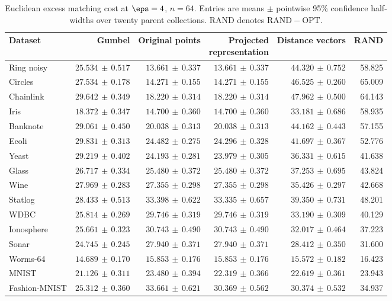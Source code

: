 \begin{table}[p]
\centering\scriptsize
\setlength{\tabcolsep}{3pt}
\caption{Euclidean excess matching cost at $\eps=4$, $n=64$. Entries are means $\pm$ pointwise 95\% confidence half-widths over twenty parent collections. RAND denotes $\mathrm{RAND}-\mathrm{OPT}$.}
\label{tab:exp-bench-p1-eps4}
\begin{tabular}{lrrrrr}
\toprule
Dataset & Gumbel & Original points & \shortstack{Projected\\representation} & Distance vectors & RAND\\
\midrule
Ring noisy & $25.534\,\pm\,0.517$ & $13.661\,\pm\,0.337$ & $13.661\,\pm\,0.337$ & $44.320\,\pm\,0.752$ & 58.825\\
Circles & $27.534\,\pm\,0.178$ & $14.271\,\pm\,0.155$ & $14.271\,\pm\,0.155$ & $46.525\,\pm\,0.260$ & 65.009\\
Chainlink & $29.642\,\pm\,0.349$ & $18.220\,\pm\,0.314$ & $18.220\,\pm\,0.314$ & $47.962\,\pm\,0.500$ & 64.143\\
Iris & $18.372\,\pm\,0.347$ & $14.700\,\pm\,0.360$ & $14.700\,\pm\,0.360$ & $33.181\,\pm\,0.686$ & 58.935\\
Banknote & $29.061\,\pm\,0.450$ & $20.038\,\pm\,0.313$ & $20.038\,\pm\,0.313$ & $44.162\,\pm\,0.443$ & 57.155\\
Ecoli & $29.831\,\pm\,0.313$ & $24.482\,\pm\,0.275$ & $24.296\,\pm\,0.328$ & $41.697\,\pm\,0.367$ & 52.776\\
Yeast & $29.219\,\pm\,0.402$ & $24.193\,\pm\,0.281$ & $23.979\,\pm\,0.305$ & $36.331\,\pm\,0.615$ & 41.638\\
Glass & $26.717\,\pm\,0.334$ & $25.480\,\pm\,0.372$ & $25.480\,\pm\,0.372$ & $37.253\,\pm\,0.695$ & 43.824\\
Wine & $27.969\,\pm\,0.283$ & $27.355\,\pm\,0.298$ & $27.355\,\pm\,0.298$ & $35.426\,\pm\,0.297$ & 42.668\\
Statlog & $28.433\,\pm\,0.513$ & $33.398\,\pm\,0.622$ & $33.335\,\pm\,0.657$ & $39.350\,\pm\,0.731$ & 48.201\\
WDBC & $25.814\,\pm\,0.269$ & $29.746\,\pm\,0.319$ & $29.746\,\pm\,0.319$ & $33.190\,\pm\,0.309$ & 40.129\\
Ionosphere & $25.661\,\pm\,0.323$ & $30.743\,\pm\,0.490$ & $30.743\,\pm\,0.490$ & $32.017\,\pm\,0.464$ & 37.223\\
Sonar & $24.745\,\pm\,0.245$ & $27.940\,\pm\,0.371$ & $27.940\,\pm\,0.371$ & $28.412\,\pm\,0.350$ & 31.600\\
Worms-64 & $14.689\,\pm\,0.170$ & $15.853\,\pm\,0.176$ & $15.853\,\pm\,0.176$ & $15.572\,\pm\,0.182$ & 16.423\\
MNIST & $21.126\,\pm\,0.311$ & $23.480\,\pm\,0.394$ & $22.319\,\pm\,0.366$ & $22.619\,\pm\,0.361$ & 23.943\\
Fashion-MNIST & $25.312\,\pm\,0.360$ & $33.661\,\pm\,0.621$ & $30.369\,\pm\,0.562$ & $30.374\,\pm\,0.532$ & 34.937\\
\bottomrule
\end{tabular}
\end{table}

